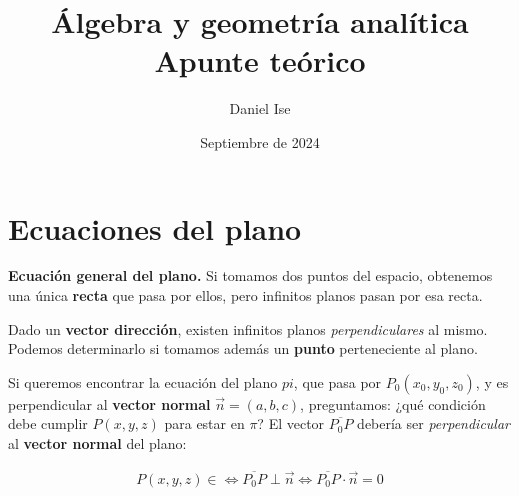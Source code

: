 \documentclass{article}
\title{Álgebra y geometría analítica\\Apunte teórico}
\author{Daniel Ise}
\date{Septiembre de 2024}
\begin{document}
\maketitle

\section*{Ecuaciones del plano}

\textbf{Ecuación general del plano.}
Si tomamos dos puntos del espacio, 
obtenemos una única \textbf{recta} que pasa por ellos, 
pero infinitos planos pasan por esa recta.

Dado un \textbf{vector dirección}, 
existen infinitos planos \textit{perpendiculares} al mismo.
Podemos determinarlo si tomamos además un \textbf{punto} perteneciente al plano.

Si queremos encontrar la ecuación del plano \(pi\), 
que pasa por \(P_0 (x_0,y_0,z_0)\), 
y es perpendicular al \textbf{vector normal} \(\vec{n} = (a,b,c)\),
preguntamos: ¿qué condición debe cumplir \(P (x, y, z)\) para estar en \(\pi\)?
El vector \(\overline{P_0P}\) debería ser \textit{perpendicular} al 
\textbf{vector normal} del plano:

\begin{align*}
    P (x, y, z) \in \iff \overline{P_0P} \perp \vec{n} \iff \overline{P_0P} \cdot \vec{n} = 0 \\
\end{align*}
\end{document}
